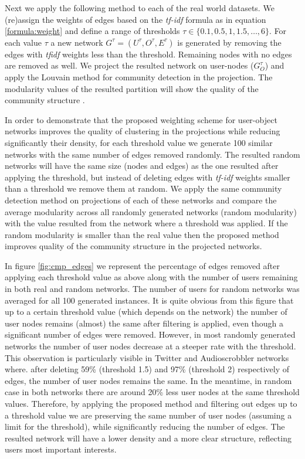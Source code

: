 Next we apply the following method to each of the real world datasets. We
(re)assign the weights of edges based on the \emph{tf-idf} formula as in
equation \ref{formula:weight} and define a range of thresholds $\tau \in \{0.1,
0.5, 1, 1.5, \ldots, 6\}$. For each value $\tau$ a new network $G^{\tau} =
(U^{\tau}, O^{\tau}, E^{\tau})$ is generated by removing the edges with
\emph{tfidf} weights less than the threshold. Remaining nodes with no edges are
removed as well. We project the resulted network on user-nodes ($G^{\tau}_O$)
and apply the Louvain method for community detection \citep{blondel2008fast} in
the projection. The modularity values of the resulted partition will show the
quality of the community structure \citep{newman2004finding}.

In order to demonstrate that the proposed weighting scheme for user-object
networks improves the quality of clustering in the projections while reducing
significantly their density, for each threshold value we generate 100 similar
networks with the same number of edges removed randomly. The resulted random
networks will have the same size (nodes and edges) as the one resulted after
applying the threshold, but instead of deleting edges with \emph{tf-idf} weights
smaller than a threshold we remove them at random. We apply the same community
detection method on projections of each of these networks and compare the
average modularity across all randomly generated networks (random modularity)
with the value resulted from the network where a threshold was applied. If the
random modularity is smaller than the real value then the proposed method
improves quality of the community structure in the projected networks.

In figure \ref{fig:cmp_edges} we represent the percentage of edges removed after
applying each threshold value as above along with the number of users remaining
in both real and random networks. The number of users for random networks was
averaged for all 100 generated instances. It is quite obvious from this figure
that up to a certain threshold value (which depends on the network) the number
of user nodes remains (almost) the same after filtering is applied, even though
a significant number of edges were removed. However, in most randomly generated
networks the number of user nodes decrease at a steeper rate with the threshold.
This observation is particularly visible in Twitter and Audioscrobbler networks
where. after deleting 59\% (threshold 1.5) and 97\% (threshold 2) respectively
of edges, the number of user nodes remains the same. In the meantime, in random
case in both networks there are around 20\% less user nodes at the same
threshold values. Therefore, by applying the proposed method and filtering out
edges up to a threshold value we are preserving the same number of user nodes
(assuming a limit for the threshold), while significantly reducing the number of
edges. The resulted network will have a lower density and a more clear
structure, reflecting users most important interests.

